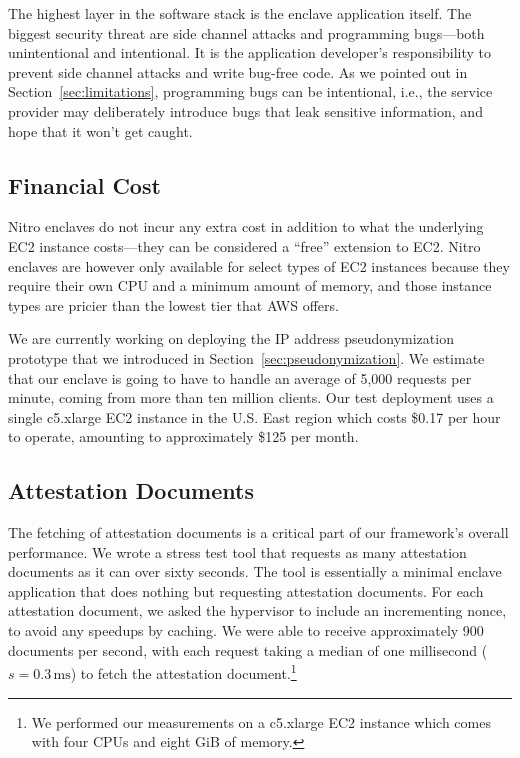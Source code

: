 The highest layer in the software stack is the enclave application itself.  The
biggest security threat are side channel attacks and programming bugs---both
unintentional and intentional.  It is the application developer's responsibility
to prevent side channel attacks and write bug-free code.  As we pointed out in
Section~\ref{sec:limitations}, programming bugs can be intentional, i.e., the
service provider may deliberately introduce bugs that leak sensitive
information, and hope that it won't get caught.

\subsection{Financial Cost}
\label{sec:cost}

Nitro enclaves do not incur any extra cost in addition to what the underlying
EC2 instance costs---they can be considered a ``free'' extension to EC2.  Nitro
enclaves are however only available for select types of EC2 instances because
they require their own CPU and a minimum amount of memory, and those instance
types are pricier than the lowest tier that AWS offers.

We are currently working on deploying the IP address pseudonymization prototype
that we introduced in Section~\ref{sec:pseudonymization}.  We estimate that our
enclave is going to have to handle an average of 5,000 requests per minute,
coming from more than ten million clients.  Our test deployment uses a single c5.xlarge
EC2 instance in the U.S. East region which costs \$0.17 per hour to operate,
amounting to approximately \$125 per month.

\subsection{Attestation Documents}
\label{sec:attestation-performance}

The fetching of attestation documents is a critical part of our framework's
overall performance.  We wrote a stress test tool that requests as many
attestation documents as it can over sixty seconds.  The tool is essentially a
minimal enclave application that does nothing but requesting attestation
documents.  For each attestation document, we asked the hypervisor to include
an incrementing nonce, to avoid any speedups by caching.  We were able to
receive approximately 900 documents per second, with each request taking a
median of one millisecond ($s = 0.3\,\text{ms}$) to fetch the attestation
document.\footnote{We performed our measurements on a c5.xlarge EC2 instance
which comes with four CPUs and eight GiB of memory.}

